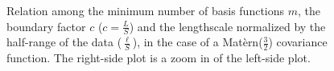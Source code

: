 \documentclass[]{interact}
\theoremstyle{plain}%
\theoremstyle{definition}
\theoremstyle{remark}
\begin{document}
\begin{figure}
\centering
{}
\hspace{3mm}
\caption{Relation among the minimum number of basis functions $m$, the boundary factor $c$ ($c = \frac{L}{S}$) and the lengthscale normalized by the half-range of the data ($\frac{\ell}{S}$), in the case of a Mat\`ern($\frac{3}{2}$) covariance function. The right-side plot is a zoom in of the left-side plot.}
  \label{fig6_lscale_vs_J_vs_c_Matern}
\end{figure}
\end{document}
